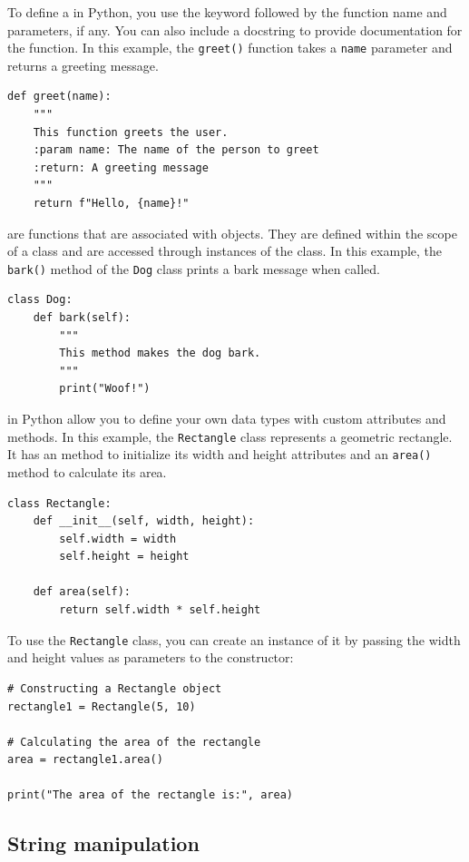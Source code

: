 To define a  in Python, you use the  keyword followed by the function name and parameters, if any. You can also include a docstring to provide documentation for the function. In this example, the \texttt{greet()} function takes a \texttt{name} parameter and returns a greeting message.
\begin{lstlisting}
def greet(name):
    """
    This function greets the user.
    :param name: The name of the person to greet
    :return: A greeting message
    """
    return f"Hello, {name}!"
\end{lstlisting}


 are functions that are associated with objects. They are defined within the scope of a class and are accessed through instances of the class. In this example, the \texttt{bark()} method of the \texttt{Dog} class prints a bark message when called.
\begin{lstlisting}
class Dog:
    def bark(self):
        """
        This method makes the dog bark.
        """
        print("Woof!")
\end{lstlisting}

 in Python allow you to define your own data types with custom attributes and methods. In this example, the \texttt{Rectangle} class represents a geometric rectangle. It has an  method to initialize its width and height attributes and an \texttt{area()} method to calculate its area.
\begin{lstlisting}
class Rectangle:
    def __init__(self, width, height):
        self.width = width
        self.height = height
        
    def area(self):
        return self.width * self.height
\end{lstlisting}

To use the \texttt{Rectangle} class, you can create an instance of it by passing the width and height values as parameters to the constructor:
\begin{lstlisting}
# Constructing a Rectangle object
rectangle1 = Rectangle(5, 10)

# Calculating the area of the rectangle
area = rectangle1.area()

print("The area of the rectangle is:", area)
\end{lstlisting}








\subsection{String manipulation}

